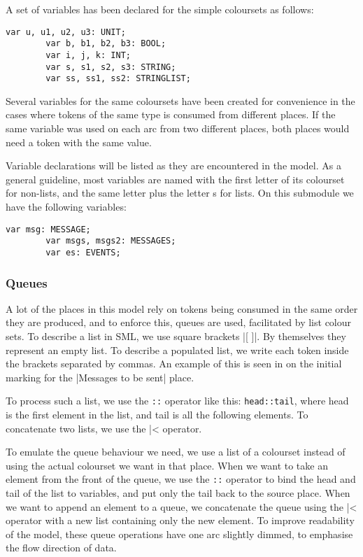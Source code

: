 		A set of variables has been declared for the simple coloursets as follows:
		
		\begin{lstlisting}[label=lst:standard_vars,caption=Simple Colourset Variables]
		var u, u1, u2, u3: UNIT;
		var b, b1, b2, b3: BOOL;
		var i, j, k: INT;
		var s, s1, s2, s3: STRING;
		var ss, ss1, ss2: STRINGLIST;
		\end{lstlisting}
		
		Several variables for the same coloursets have been created for convenience in
		the cases where tokens of the same type is consumed from different places. If the same variable was
		used on each arc from two different places, both places would need a token
		with the same value. 
		
		Variable declarations will be listed as they are encountered in the model.
		As a general guideline, most variables are named with the first letter of its
		colourset for non-lists, and the same letter plus the letter s for lists. On
		this submodule we have the following variables:
		
		\begin{lstlisting}[label=lst:client_app_vars,caption=Client Application
		Variables]
		var msg: MESSAGE;
		var msgs, msgs2: MESSAGES;
		var es: EVENTS;
		\end{lstlisting}
	
	\subsubsection{Queues}
	
		A lot of the places in this model rely on tokens being consumed in the same
		order they are produced, and to enforce this, queues are used, facilitated
		by list colour sets. To describe a list in SML, we use square
		brackets |[ ]|. By themselves they represent an empty list. To describe a populated list, we
		write each token inside the brackets separated by commas. An example of this
		is seen in  on the initial marking for the
		|Messages to be sent| place.
		
		To process such a list, we use the \lstinline-::- operator like this:
		\lstinline-head::tail-, where head is the first element in the list, and tail
		is all the following elements. To concatenate two lists, we use the
		|^^| operator. 
		
		To emulate the queue behaviour we need, we use a list of a colourset instead
		of using the actual colourset we want in that place. When we want to take an
		element from the front of the queue, we use the \lstinline-::- operator to
		bind the head and tail of the list to variables, and put only the tail back to
		the source place. When we want to append an element to a queue, we concatenate
		the queue using the |^^| operator with a new list containing only
		the new element. To improve readability of the model, these queue operations
		have one arc slightly dimmed, to emphasise the flow direction of data.
		
